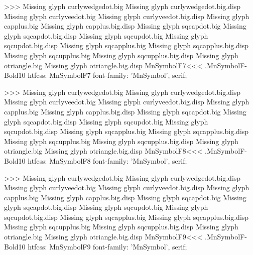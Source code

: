 >>>
Missing glyph	curlywedgedot.big
Missing glyph	curlywedgedot.big.disp
Missing glyph	curlyveedot.big
Missing glyph	curlyveedot.big.disp
Missing glyph	capplus.big
Missing glyph	capplus.big.disp
Missing glyph	sqcapdot.big
Missing glyph	sqcapdot.big.disp
Missing glyph	sqcupdot.big
Missing glyph	sqcupdot.big.disp
Missing glyph	sqcapplus.big
Missing glyph	sqcapplus.big.disp
Missing glyph	sqcupplus.big
Missing glyph	sqcupplus.big.disp
Missing glyph	otriangle.big
Missing glyph	otriangle.big.disp
\<MnSymbolF7\><<<
.MnSymbolF-Bold10
htfcss:  MnSymbolF7  font-family: 'MnSymbol', serif;

>>>
Missing glyph	curlywedgedot.big
Missing glyph	curlywedgedot.big.disp
Missing glyph	curlyveedot.big
Missing glyph	curlyveedot.big.disp
Missing glyph	capplus.big
Missing glyph	capplus.big.disp
Missing glyph	sqcapdot.big
Missing glyph	sqcapdot.big.disp
Missing glyph	sqcupdot.big
Missing glyph	sqcupdot.big.disp
Missing glyph	sqcapplus.big
Missing glyph	sqcapplus.big.disp
Missing glyph	sqcupplus.big
Missing glyph	sqcupplus.big.disp
Missing glyph	otriangle.big
Missing glyph	otriangle.big.disp
\<MnSymbolF8\><<<
.MnSymbolF-Bold10
htfcss:  MnSymbolF8  font-family: 'MnSymbol', serif;

>>>
Missing glyph	curlywedgedot.big
Missing glyph	curlywedgedot.big.disp
Missing glyph	curlyveedot.big
Missing glyph	curlyveedot.big.disp
Missing glyph	capplus.big
Missing glyph	capplus.big.disp
Missing glyph	sqcapdot.big
Missing glyph	sqcapdot.big.disp
Missing glyph	sqcupdot.big
Missing glyph	sqcupdot.big.disp
Missing glyph	sqcapplus.big
Missing glyph	sqcapplus.big.disp
Missing glyph	sqcupplus.big
Missing glyph	sqcupplus.big.disp
Missing glyph	otriangle.big
Missing glyph	otriangle.big.disp
\<MnSymbolF9\><<<
.MnSymbolF-Bold10
htfcss:  MnSymbolF9  font-family: 'MnSymbol', serif;

